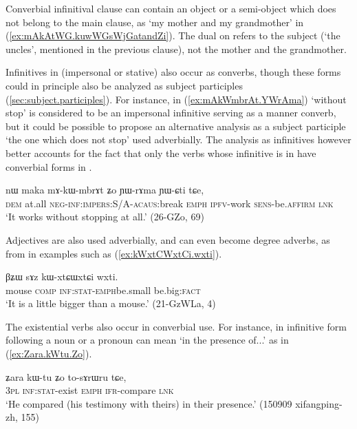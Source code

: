 Converbial infinitival clause can contain an object or a semi-object which does not belong to the main clause, as  `my mother and my grandmother' in (\ref{ex:mAkAtWG.kuwWGsWjGatandZi}). The dual on  refers to the subject (`the uncles', mentioned in the previous clause), not the mother and the grandmother.

Infinitives in  (impersonal or stative) also occur as converbs, though these forms could in principle also be analyzed as subject participles (\ref{sec:subject.participles}). For instance, in (\ref{ex:mAkWmbrAt.YWrAma})  `without stop' is considered to be an impersonal infinitive serving as a manner converb, but it could be possible to propose an alternative analysis as a  subject participle `the one which does not stop' used adverbially.  The analysis as infinitives however better accounts for the fact that only the verbs whose infinitive is in  have converbial forms in .

\begin{exe}
\ex \label{ex:mAkWmbrAt.YWrAma}
 \gll nɯ maka mɤ-kɯ-mbrɤt ʑo ɲɯ-rɤma ɲɯ-ɕti tɕe,  \\
 \textsc{dem} at.all  \textsc{neg}-\textsc{inf:impers}:S/A-\textsc{acaus}:break \textsc{emph} \textsc{ipfv}-work \textsc{sens}-be.\textsc{affirm} \textsc{lnk} \\
 \glt `It works without stopping at all.' (26-GZo, 69)
\end{exe}

Adjectives are also used adverbially, and can even become degree adverbs, as  from  in examples such as (\ref{ex:kWxtCWxtCi.wxti}).

\begin{exe}
\ex \label{ex:kWxtCWxtCi.wxti}
 \gll βʑɯ sɤz kɯ-xtɕɯ\redp{}xtɕi wxti. \\
 mouse \textsc{comp} \textsc{inf:stat}-\textsc{emph}\redp{}be.small be.big:\textsc{fact} \\
 \glt `It is a little bigger than a mouse.' (21-GzWLa, 4)
\end{exe}

The existential verbs also occur in converbial use. For instance,  in infinitive form  following a noun or a pronoun can mean `in the presence of...' as in (\ref{ex:Zara.kWtu.Zo}).

\begin{exe}
\ex \label{ex:Zara.kWtu.Zo}
\gll ʑara kɯ-tu ʑo to-sɤrɯru tɕe, \\
\textsc{3pl} \textsc{inf:stat}-exist \textsc{emph} \textsc{ifr}-compare \textsc{lnk} \\
\glt `He compared (his testimony with theirs) in their presence.' (150909 xifangping-zh, 155)
\end{exe}


